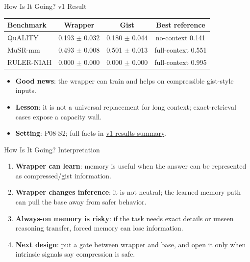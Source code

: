\begin{frame}{How Is It Going? v1 Result}
  \small
  \begin{table}
    \centering
    \begin{tabular}{lccc}
      \toprule
      Benchmark & Wrapper & Gist & Best reference \\
      \midrule
      QuALITY & 0.193 $\pm$ 0.032 & 0.180 $\pm$ 0.044 & no-context 0.141 \\
      MuSR-mm & 0.493 $\pm$ 0.008 & 0.501 $\pm$ 0.013 & full-context 0.551 \\
      RULER-NIAH & 0.000 $\pm$ 0.000 & 0.000 $\pm$ 0.000 & full-context 0.995 \\
      \bottomrule
    \end{tabular}
  \end{table}
  \begin{itemize}
    \item \textbf{Good news}: the wrapper can train and helps on compressible
      gist-style inputs.
    \item \textbf{Lesson}: it is not a universal replacement for long context;
      exact-retrieval cases expose a capacity wall.
    \item \textbf{Setting}: P08-S2; full facts in
      \href{https://github.com/BDeMo/research-notes/blob/main/notes/plans/08-model-outputs-delta-w/v1-results-2026-06-03.md}{v1 results summary}.
  \end{itemize}
\end{frame}

\begin{frame}{How Is It Going? Interpretation}
  \begin{enumerate}
    \item \textbf{Wrapper can learn}: memory is useful when the answer can be
      represented as compressed/gist information.
    \item \textbf{Wrapper changes inference}: it is not neutral; the learned
      memory path can pull the base away from safer behavior.
    \item \textbf{Always-on memory is risky}: if the task needs exact details or
      unseen reasoning transfer, forced memory can lose information.
    \item \textbf{Next design}: put a gate between wrapper and base, and open it
      only when intrinsic signals say compression is safe.
  \end{enumerate}
\end{frame}

